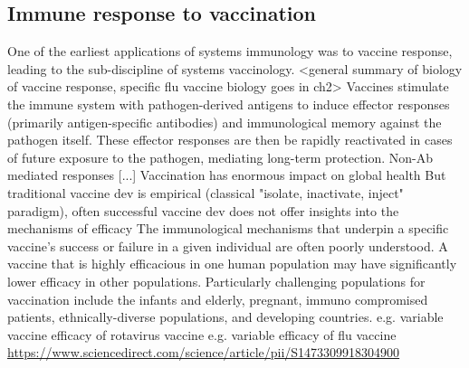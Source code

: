 \begin{outline}

\subsection{Immune response to vaccination}

\1 One of the earliest applications of systems immunology was to vaccine response, leading to the sub-discipline of systems vaccinology.
    \2 <general summary of biology of vaccine response, specific flu vaccine biology goes in ch2>
        \3 Vaccines stimulate the immune system with pathogen-derived antigens to induce effector responses (primarily antigen-specific antibodies) and immunological memory against the pathogen itself.
        \3 These effector responses are then be rapidly reactivated in cases of future exposure to the pathogen, mediating long-term protection.
        \3 Non-Ab mediated responses [...]
    \2 Vaccination has enormous impact on global health \autocite{greenwood2014ContributionVaccinationGlobal}
    \2 But traditional vaccine dev is empirical (classical "isolate, inactivate, inject" paradigm), often successful vaccine dev does not offer insights into the mechanisms of efficacy 
    \2 The immunological mechanisms that underpin a specific vaccine's success or failure in a given individual are often poorly understood.
    \2 A vaccine that is highly efficacious in one human population may have significantly lower efficacy in other populations.
    Particularly challenging populations for vaccination include the infants and elderly, pregnant, immuno compromised patients, ethnically-diverse populations, and developing countries.
        \3 e.g. variable vaccine efficacy of rotavirus vaccine
        \3 e.g. variable efficacy of flu vaccine \url{https://www.sciencedirect.com/science/article/pii/S1473309918304900}


\end{outline}
